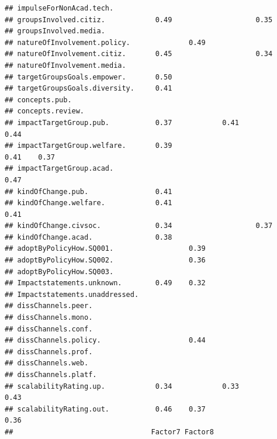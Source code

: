 \documentclass[
]{article}
\begin{document}
\begin{verbatim}
## impulseForNonAcad.tech.                                                        
## groupsInvolved.citiz.            0.49                    0.35                  
## groupsInvolved.media.                                                          
## natureOfInvolvement.policy.              0.49                                  
## natureOfInvolvement.citiz.       0.45                    0.34                  
## natureOfInvolvement.media.                                                     
## targetGroupsGoals.empower.       0.50                                          
## targetGroupsGoals.diversity.     0.41                                          
## concepts.pub.                                                                  
## concepts.review.                                                               
## impactTargetGroup.pub.           0.37            0.41                    0.44  
## impactTargetGroup.welfare.       0.39                            0.41    0.37  
## impactTargetGroup.acad.                                                  0.47  
## kindOfChange.pub.                0.41                                          
## kindOfChange.welfare.            0.41                            0.41          
## kindOfChange.civsoc.             0.34                    0.37                  
## kindOfChange.acad.               0.38                                          
## adoptByPolicyHow.SQ001.                  0.39                                  
## adoptByPolicyHow.SQ002.                  0.36                                  
## adoptByPolicyHow.SQ003.                                                        
## Impactstatements.unknown.        0.49    0.32                                  
## Impactstatements.unaddressed.                                                  
## dissChannels.peer.                                                             
## dissChannels.mono.                                                             
## dissChannels.conf.                                                             
## dissChannels.policy.                     0.44                                  
## dissChannels.prof.                                                             
## dissChannels.web.                                                              
## dissChannels.platf.                                                            
## scalabilityRating.up.            0.34            0.33                    0.43  
## scalabilityRating.out.           0.46    0.37                            0.36  
##                                 Factor7 Factor8

\end{verbatim}
\end{document}
